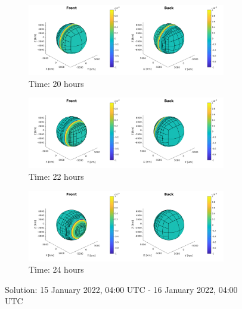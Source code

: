 \documentclass[twoside]{bsu-ms}
\begin{document}
\medskip

\begin{figure}[!htbp]\ContinuedFloat
\vspace{-15pt}
\centering
\begin{subfigure}{\textwidth}
  \centering
  \includegraphics[width=0.95\textwidth,clip=True,trim=4cm 0cm 4cm 0cm]{images/ideal/ideal_40.png}
  \caption{Time: 20 hours }
\end{subfigure}

\medskip

\begin{subfigure}{\textwidth}
  \centering
  \includegraphics[width=0.95\textwidth,clip=True,trim=4cm 0cm 4cm 0cm]{images/ideal/ideal_44.png}
  \caption{Time: 22 hours}
  \end{subfigure}

\medskip

\begin{subfigure}{\textwidth}
  \centering
  \includegraphics[width=0.95\textwidth,clip=True,trim=4cm 0cm 4cm 0cm]{images/ideal/ideal_48.png}
  \caption{Time: 24 hours }
\end{subfigure}

\caption{Solution: 15 January 2022, 04:00 $\mathrm{UTC}$ - 16 January 2022, 04:00 $\mathrm{UTC}$}
\label{fig:3.2}
\end{figure}
\end{document}

